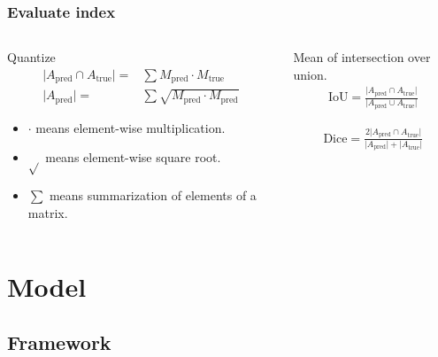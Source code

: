 \documentclass[12pt, aspectratio = 169, xcolor = x11names]{beamer}
\begin{document}
\begin{frame}
  \frametitle{Evaluate index}
  \begin{columns}
    \begin{column}{0.5\textwidth}
      \begin{block}{Quantize}
        \begin{align*}
          \lvert A_\mathrm{pred} \cap A_\mathrm{true}\rvert = & \sum M_\mathrm{pred} \cdot M_\mathrm{true}\\
          \lvert A_\mathrm{pred}\rvert = & \sum\sqrt{M_\mathrm{pred} \cdot M_\mathrm{pred}}
        \end{align*}
        \begin{itemize}
          \item$\cdot$ means element-wise multiplication.
          \item$\sqrt{}$ means element-wise square root.
          \item$\sum$ means summarization of elements of a matrix.
        \end{itemize}
      \end{block}
    \end{column}
    \begin{column}{0.5\textwidth}
      \begin{definition}[mIoU]
        Mean of intersection over union.
        \begin{align*}
          \mathrm{IoU} = \frac{\lvert A_\mathrm{pred} \cap A_\mathrm{true}\rvert}{\lvert A_\mathrm{pred} \cup A_\mathrm{true}\rvert}
        \end{align*}
      \end{definition}
      \begin{definition}
        \begin{align*}
          \mathrm{Dice} = \frac{2\lvert A_\mathrm{pred} \cap A_\mathrm{true}\rvert}{\lvert A_\mathrm{pred}\rvert + \lvert A_\mathrm{true}\rvert}
        \end{align*}
      \end{definition}
    \end{column}
  \end{columns}
\end{frame}

\section{Model}%
\label{sec:model}

\subsection{Framework}%
\label{sub:framework}
\end{document}
